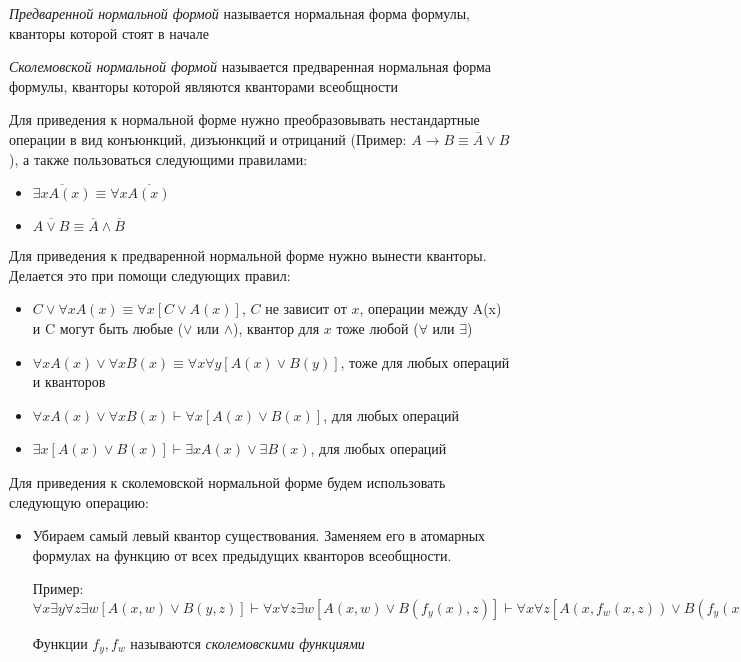 \documentclass{article}
\begin{document}
\begin{definition}
	\textit{Предваренной нормальной формой} называется нормальная форма формулы, кванторы которой стоят в начале
\end{definition}

\begin{definition}
	\textit{Сколемовской нормальной формой} называется предваренная нормальная форма формулы, кванторы которой являются кванторами всеобщности
\end{definition}

Для приведения к нормальной форме нужно преобразовывать нестандартные операции в вид конъюнкций, дизъюнкций и отрицаний (Пример: $A \rightarrow B \equiv \overline{A} \vee B$), а также пользоваться следующими правилами:
\begin{itemize}
	\item $\overline{\exists x A(x)} \equiv \forall x\overline{A(x)}$
	\item $\overline{A \vee B} \equiv \overline{A} \wedge \overline{B}$
\end{itemize}

Для приведения к предваренной нормальной форме нужно вынести кванторы. Делается это при помощи следующих правил:
\begin{itemize}
	\item $C \vee \forall x A(x) \equiv \forall x[C \vee A(x)]$, $C$ не зависит от $x$, операции между A(x) и C могут быть любые ($\vee$ или $\wedge$), квантор для $x$ тоже любой ($\forall$ или $\exists$)
	\item $\forall x A(x) \vee \forall x B(x) \equiv \forall x\forall y[A(x) \vee B(y)]$, тоже для любых операций и кванторов
	\item $\forall x A(x) \vee \forall x B(x) \vdash \forall x[A(x) \vee B(x)]$, для любых операций
	\item $\exists x[A(x) \vee B(x)] \vdash \exists x A(x) \vee \exists B(x)$, для любых операций
\end{itemize}
	
Для приведения к сколемовской нормальной форме будем использовать следующую операцию:
\begin{itemize}
	\item Убираем самый левый квантор существования. Заменяем его в атомарных формулах на функцию от всех предыдущих кванторов всеобщности.
	
	Пример: $\forall x \exists y \forall z \exists w[A(x, w) \vee B(y, z)] \vdash \forall x \forall z \exists w[A(x, w) \vee B(f_y(x), z)] \vdash \forall x \forall z[A(x, f_w(x, z)) \vee B(f_y(x), z)]$
	
	Функции $f_y, f_w$ называются \textit{сколемовскими функциями}
\end{itemize}
\end{document}
